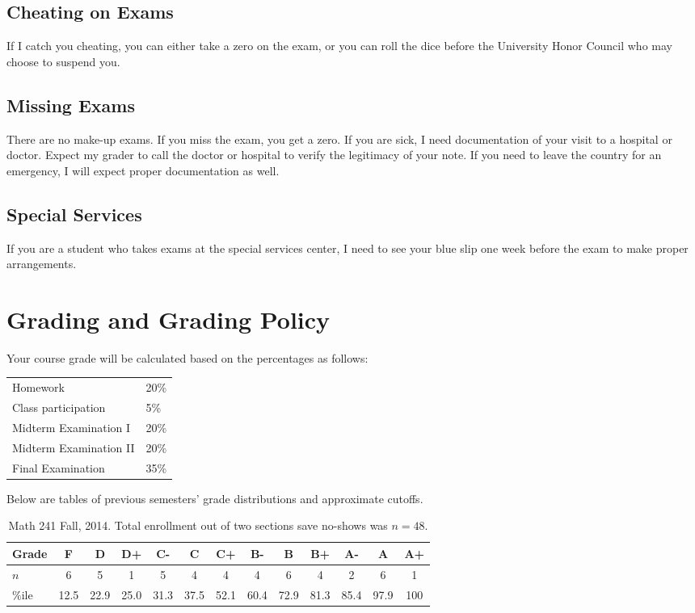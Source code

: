 \documentclass[12pt]{article}
\begin{document}
\subsection*{Cheating on Exams}

If I catch you cheating, you can either take a zero on the exam, or you can roll the dice before the University Honor Council who may choose to suspend you.


\subsection*{Missing Exams}

There are no make-up exams. If you miss the exam, you get a zero. If you are sick, I need documentation of your visit to a hospital or doctor. Expect my grader to call the doctor or hospital to verify the legitimacy of your note. If you need to leave the country for an emergency, I will expect proper documentation as well.

\subsection*{Special Services}

If you are a student who takes exams at the special services center, I need to see your blue slip one week before the exam to make proper arrangements.


\section*{Grading and Grading Policy}

Your course grade will be calculated based on the percentages as follows: 

\begin{table}[h]
\centering
\begin{tabular}{l|l}
Homework & 20\% \\
Class participation & 5\% \\
Midterm Examination I & 20\%\\
Midterm Examination II & 20\%\\
Final Examination & 35\%
\end{tabular}
\end{table}
\FloatBarrier

\noindent Below are tables of previous semesters' grade distributions and approximate cutoffs.

\begin{table}[htp]
\centering
\begin{tabular}{l|cccccccccccc}
Grade & F & D & D+ & C- & C & C+ & B- & B & B+ & A- & A & A+ \\ \hline
$n$ & 6 & 5 & 1 & 5 & 4 & 4 & 4 & 6 & 4 & 2 & 6 & 1 \\
\%ile & 12.5 & 22.9 &  25.0 & 31.3 & 37.5 & 52.1 & 60.4 & 72.9 & 81.3 &  85.4 & 97.9 & 100 \\ \hline
\end{tabular}
\caption{Math 241 Fall, 2014. Total enrollment out of two sections save no-shows was $n=48$.}
\end{table}
\end{document}
